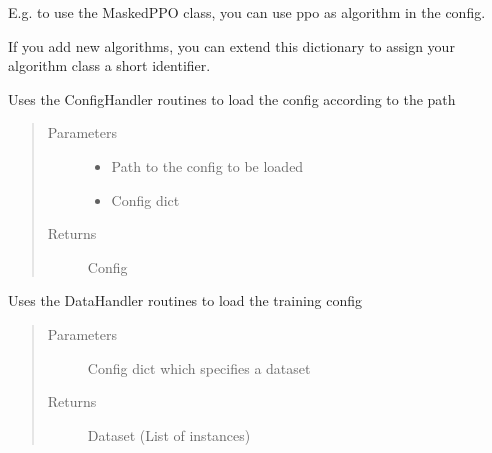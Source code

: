 \documentclass[letterpaper,10pt,english]{sphinxmanual}
\begin{document}
\sphinxAtStartPar
E.g. to use the MaskedPPO class, you can use ppo as algorithm in the config.

\sphinxAtStartPar
If you add new algorithms, you can extend this dictionary to assign your algorithm class a short identifier.


\begin{fulllineitems}
\sphinxAtStartPar
Uses the ConfigHandler routines to load the config according to the path
\begin{quote}\begin{description}
\item[{Parameters}] \leavevmode\begin{itemize}
\item {} 
\sphinxAtStartPar
{} \textendash{} Path to the config to be loaded

\item {} 
\sphinxAtStartPar
{} \textendash{} Config dict

\end{itemize}

\item[{Returns}] \leavevmode
\sphinxAtStartPar
Config

\end{description}\end{quote}

\end{fulllineitems}



\begin{fulllineitems}
\sphinxAtStartPar
Uses the DataHandler routines to load the training config
\begin{quote}\begin{description}
\item[{Parameters}] \leavevmode
\sphinxAtStartPar
{} \textendash{} Config dict which specifies a dataset

\item[{Returns}] \leavevmode
\sphinxAtStartPar
Dataset (List of instances)

\end{description}\end{quote}

\end{fulllineitems}
\end{document}
